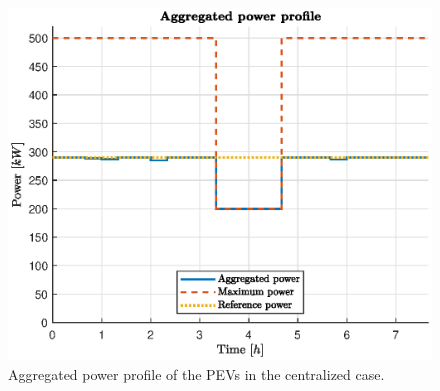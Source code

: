 \begin{figure}[H]
    \centering
    \includegraphics[width=\columnwidth]{figures/images/cen_power.eps}
    \caption{Aggregated power profile of the PEVs in the centralized case.}
    \label{fig:cen_power}
\end{figure}

